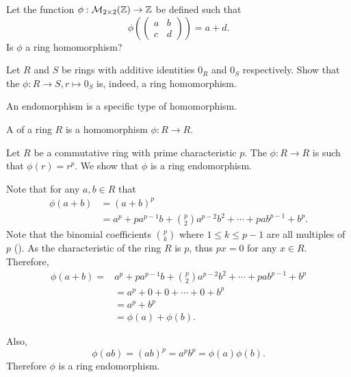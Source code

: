 \begin{exercise}
    Let the function $\phi: \mathcal{M}_{2\times2}(\mathbb{Z}) \to \mathbb{Z}$ be defined such that
    \[
        \phi\left(\begin{pmatrix}a&b\\c&d\end{pmatrix}\right) = a+d.
    \]
    Is $\phi$ a ring homomorphism?
\end{exercise}
\begin{exercise}
    Let $R$ and $S$ be rings with additive identities $0_R$ and $0_S$ respectively. Show that the  $\phi: R \to S, r \mapsto 0_S$ is, indeed, a ring homomorphism.
\end{exercise}

\pagebreak

An endomorphism is a specific type of homomorphism.
\begin{definition}
    A  of a ring $R$ is a homomorphism $\phi: R \to R$.
\end{definition}
\begin{example}
    Let $R$ be a commutative ring with prime characteristic $p$. The  $\phi: R \to R$ is such that $\phi(r) = r^p$. We show that $\phi$ is a ring endomorphism.

    Note that for any $a, b \in R$ that
    \begin{align*}
        \phi(a+b) &= (a+b)^p\\
        &= a^p + pa^{p-1}b + {p \choose 2}a^{p-2}b^2 + \cdots + pab^{p-1} + b^p.
    \end{align*}
    Note that the binomial coefficients ${p \choose k}$ where $1 \leq k \leq p-1$ are all multiples of $p$ (). As the characteristic of the ring $R$ is $p$, thus $px = 0$ for any $x \in R$. Therefore,
    \begin{align*}
        \phi(a+b) = &a^p + pa^{p-1}b + {p \choose 2}a^{p-2}b^2 + \cdots + pab^{p-1} + b^p\\
        &= a^p + 0 + 0 + \cdots + 0 + b^p\\
        &= a^p + b^p\\
        &=\phi(a) + \phi(b).
    \end{align*}

    Also,
    \[
        \phi(ab) = (ab)^p = a^pb^p = \phi(a)\phi(b).
    \]
    Therefore $\phi$ is a ring endomorphism.
\end{example}

